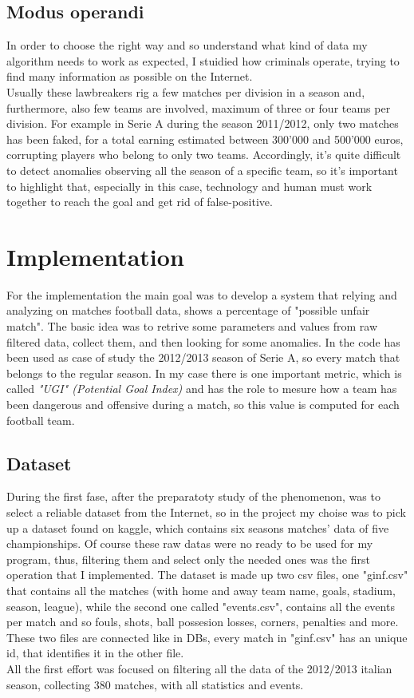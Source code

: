 \documentclass[a4paper,titlepage,11pt]{report}
\begin{document}
{\section{
Modus operandi}
In order to choose the right way and so understand what kind of data my algorithm needs to work as expected, I stuidied how criminals operate, trying to find many information as possible on the Internet.\\
Usually these lawbreakers rig a few matches per division in a season and, furthermore, also few teams are involved, maximum of three or four teams per division. For example in Serie A during the season 2011/2012, only two matches has been faked, for a total earning estimated between 300'000 and 500'000 euros, corrupting players who belong to only two teams. Accordingly, it's quite difficult to detect anomalies observing all the season of a specific team, so it's important to highlight that, especially in this case, technology and human must work together to reach the goal and get rid of false-positive.\\

\chapter{
Implementation}
For the implementation the main goal was to develop a system that relying and analyzing on matches football data, shows a percentage of "possible unfair match". The basic idea was to retrive some parameters and values from raw filtered data, collect them, and then looking for some anomalies. In the code has been used as case of study the 2012/2013 season of Serie A, so every match that belongs to the regular season. In my case there is one important metric, which is called \textit{"UGI" (Potential Goal Index)} and has the role to mesure how a team has been dangerous and offensive during a match, so this value is computed for each football team. 

\section{
Dataset}
During the first fase, after the preparatoty study of the phenomenon, was to select a reliable dataset from the Internet, so in the project my choise was to pick up a dataset found on kaggle, which contains six seasons matches' data of five championships. Of course these raw datas were no ready to be used for my program, thus, filtering them and select only the needed ones was the first operation that I implemented. The dataset is made up two csv files, one "ginf.csv" that contains all the matches (with home and away team name, goals, stadium, season, league), while the second one called "events.csv", contains all the events per match and so fouls, shots, ball possesion losses, corners, penalties and more. These two files are connected like in DBs, every match in "ginf.csv"  has an unique id, that identifies it in the other file.\\
All the first effort was focused on filtering all the data of the 2012/2013 italian season, collecting 380 matches, with all statistics and events. 

}
\end{document}
